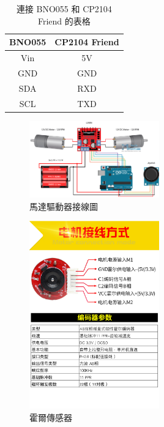 \begin{table}[ht]
\centering
\begin{tabular}{|c|c|}
\hline
\textbf{BNO055} & \textbf{CP2104 Friend} \\
\hline
Vin & 5V \\
\hline
GND & GND \\
\hline
SDA & RXD \\
\hline
SCL & TXD \\
\hline
\end{tabular}
\caption{連接 BNO055 和 CP2104 Friend 的表格}
\label{tab:connection}
\end{table}

\begin{figure}[ht]
\centering
\includegraphics[width=0.5\textwidth]{./img/L298N.png}
\caption{馬達驅動器接線圖}
\label{fig:example}
\end{figure}
\begin{figure}
\centering
\includegraphics[width=0.5\textwidth]{./img/ZiWcCqr.png}
\caption{霍爾傳感器}
\label{fig:example1}
\end{figure}

